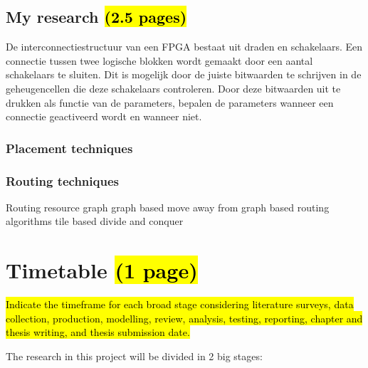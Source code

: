 \documentclass[a4paper,oneside,12pt]{article}
\begin{document}
\subsection{My research \hl{(2.5 pages)}}

De interconnectiestructuur van een FPGA bestaat uit draden en schakelaars. Een connectie tussen twee logische blokken wordt gemaakt door een aantal schakelaars te sluiten. Dit is mogelijk door de juiste bitwaarden te schrijven in de geheugencellen die deze schakelaars controleren. Door deze bitwaarden uit te drukken als functie van de parameters, bepalen de parameters wanneer een connectie geactiveerd wordt en wanneer niet.


\subsubsection{Placement techniques}\label{placetech}


\subsubsection{Routing techniques}\label{routetech}

Routing resource graph
graph based
move away from graph based routing algorithms
tile based
divide and conquer

\newpage

\section{Timetable \hl{(1 page)}}\label{timetable}
\hl{ Indicate the timeframe for each broad stage considering literature surveys, data collection, production, modelling, review, analysis,
testing, reporting, chapter and thesis writing, and thesis submission date.}

The research in this project will be divided in 2 big stages:
\end{document}

